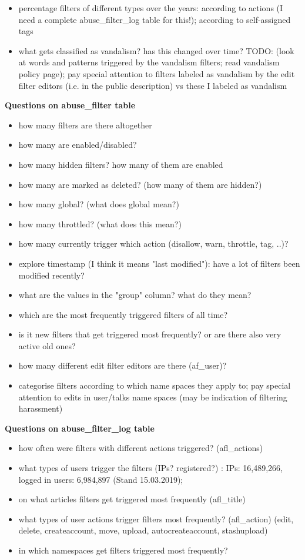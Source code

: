 \documentclass{sigchi}
\begin{document}
\begin{itemize}
    \item percentage filters of different types over the years: according to actions (I need a complete abuse\_filter\_log table for this!); according to self-assigned tags %
    \item what gets classified as vandalism? has this changed over time? TODO: (look at words and patterns triggered by the vandalism filters; read vandalism policy page); pay special attention to filters labeled as vandalism by the edit filter editors (i.e. in the public description) vs these I labeled as vandalism
\end{itemize}

\textbf{Questions on abuse\_filter table}
\begin{itemize}
    \item how many filters are there altogether
    \item how many are enabled/disabled?
    \item how many hidden filters? how many of them are enabled
    \item how many are marked as deleted? (how many of them are hidden?)
    \item how many global? (what does global mean?)
    \item how many throttled? (what does this mean?)
    \item how many currently trigger which action (disallow, warn, throttle, tag, ..)?
    \item explore timestamp (I think it means "last modified"): have a lot of filters been modified recently?
    \item what are the values in the "group" column? what do they mean?
    \item which are the most frequently triggered filters of all time?
    \item is it new filters that get triggered most frequently? or are there also very active old ones?
    \item how many different edit filter editors are there (af\_user)?
    \item categorise filters according to which name spaces they apply to; pay special attention to edits in user/talks name spaces (may be indication of filtering harassment)
\end{itemize}

\textbf{Questions on abuse\_filter\_log table}
\begin{itemize}
    \item how often were filters with different actions triggered? (afl\_actions)
    \item what types of users trigger the filters (IPs? registered?) : IPs: 16,489,266, logged in users: 6,984,897 (Stand 15.03.2019);
    \item on what articles filters get triggered most frequently (afl\_title)
    \item what types of user actions trigger filters most frequently? (afl\_action) (edit, delete, createaccount, move, upload, autocreateaccount, stashupload)
    \item in which namespaces get filters triggered most frequently?
\end{itemize}
\end{document}

